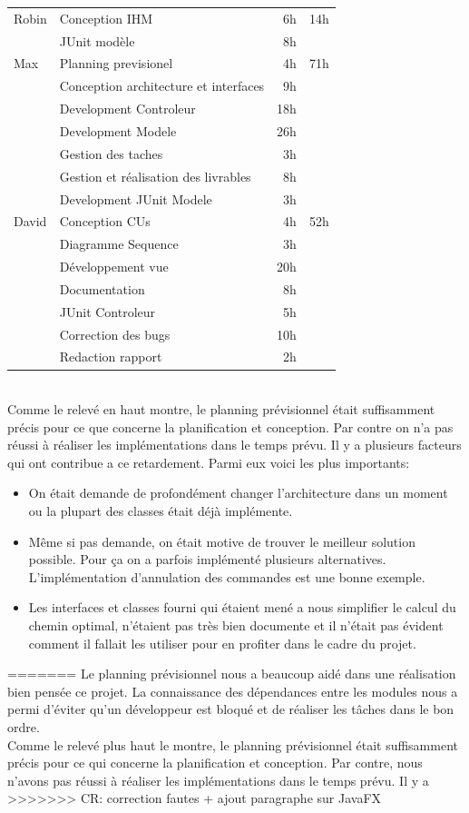 \documentclass[10pt,a4paper]{book}
\begin{document}
\begin{longtable}{|l|l|r|l|}
\hline
Robin & Conception IHM & 6h & 14h\\
\cline{2-3}
& JUnit modèle & 8h & ~\\
\hline

\hline
Max & Planning previsionel & 4h & 71h\\
\cline{2-3}
& Conception architecture et interfaces & 9h & ~\\
\cline{2-3}
& Development Controleur & 18h & ~\\
\cline{2-3}
& Development Modele & 26h & ~\\
\cline{2-3}
& Gestion des taches & 3h & ~\\
\cline{2-3}
& Gestion et réalisation des livrables & 8h & ~\\
\cline{2-3}
& Development JUnit Modele & 3h & ~\\
\hline

\hline
David & Conception CUs & 4h & 52h\\
\cline{2-3}
& Diagramme Sequence & 3h & ~\\
\cline{2-3}
& Développement vue & 20h & ~\\
\cline{2-3}
& Documentation & 8h & ~\\
\cline{2-3}
& JUnit Controleur & 5h & ~\\
\cline{2-3}
& Correction des bugs & 10h & ~\\
\cline{2-3}
& Redaction rapport & 2h & ~\\
\hline
\end{longtable}
~\\Comme le relevé en haut montre, le planning prévisionnel était suffisamment précis pour ce que concerne la planification et conception. Par contre on n'a pas réussi à réaliser les implémentations dans le temps prévu. Il y a plusieurs facteurs qui ont contribue a ce retardement. Parmi eux voici les plus importants:
\begin{itemize}
	\item{On était demande de profondément changer l'architecture dans un moment ou la plupart des classes était déjà implémente.}
	\item{Même si pas demande, on était motive de trouver le meilleur solution possible. Pour ça on a parfois implémenté plusieurs alternatives. L'implémentation d'annulation des commandes est une bonne exemple.}
	\item{Les interfaces et classes fourni qui étaient mené a nous simplifier le calcul du chemin optimal, n'étaient pas très bien documente et il n'était pas évident comment il fallait les utiliser pour en profiter dans le cadre du projet.}
\end{itemize}
=======
Le planning prévisionnel nous a beaucoup aidé dans une réalisation bien pensée ce projet. La connaissance des dépendances entre les modules nous a permi d'éviter qu'un développeur est bloqué et de réaliser les tâches dans le bon ordre.\\
Comme le relevé plus haut le montre, le planning prévisionnel était suffisamment précis pour ce qui concerne la planification et conception. Par contre, nous n'avons pas réussi à réaliser les implémentations dans le temps prévu. Il y a 
>>>>>>> CR: correction fautes + ajout paragraphe sur JavaFX
\end{document}
